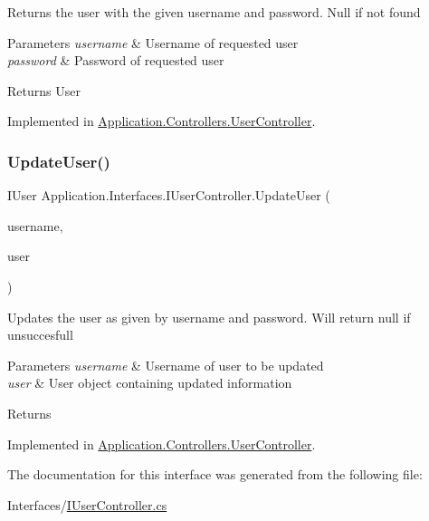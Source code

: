 Returns the user with the given username and password. Null if not found 


\begin{DoxyParams}{Parameters}
{\em username} & Username of requested user\\
\hline
{\em password} & Password of requested user\\
\hline
\end{DoxyParams}
\begin{DoxyReturn}{Returns}
User
\end{DoxyReturn}


Implemented in \mbox{\hyperlink{class_application_1_1_controllers_1_1_user_controller_adb2565915559692fae6a146d23d5fe01}{Application.\+Controllers.\+User\+Controller}}.

\mbox{\label{interface_application_1_1_interfaces_1_1_i_user_controller_a433f4021d60dafe735aff4d4b5536370}} 
\subsubsection{\texorpdfstring{Update\+User()}{UpdateUser()}}
{\footnotesize\ttfamily I\+User Application.\+Interfaces.\+I\+User\+Controller.\+Update\+User (\begin{DoxyParamCaption}\item[{string}]{username,  }\item[{I\+User}]{user }\end{DoxyParamCaption})}



Updates the user as given by username and password. Will return null if unsuccesfull 


\begin{DoxyParams}{Parameters}
{\em username} & Username of user to be updated\\
\hline
{\em user} & User object containing updated information\\
\hline
\end{DoxyParams}
\begin{DoxyReturn}{Returns}

\end{DoxyReturn}


Implemented in \mbox{\hyperlink{class_application_1_1_controllers_1_1_user_controller_af509b1d73f3a654edfb48dcc1f623ca8}{Application.\+Controllers.\+User\+Controller}}.



The documentation for this interface was generated from the following file\+:\begin{DoxyCompactItemize}
\item 
Interfaces/\mbox{\hyperlink{_i_user_controller_8cs}{I\+User\+Controller.\+cs}}\end{DoxyCompactItemize}
